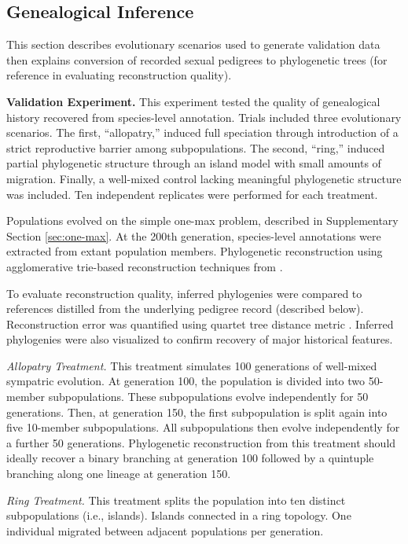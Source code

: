 \subsection{Genealogical Inference}
\label{sec:genealogical-inference}

This section describes evolutionary scenarios used to generate validation data then explains conversion of recorded sexual pedigrees to phylogenetic trees (for reference in evaluating reconstruction quality).

\textbf{Validation Experiment.}
This experiment tested the quality of genealogical history recovered from species-level  annotation.
Trials included three evolutionary scenarios.
The first, ``allopatry,'' induced full speciation through introduction of a strict reproductive barrier among subpopulations.
The second, ``ring,'' induced partial phylogenetic structure through an island model with small amounts of migration.
Finally, a well-mixed control lacking meaningful phylogenetic structure was included.
Ten independent replicates were performed for each treatment.

Populations evolved on the simple one-max problem, described in Supplementary Section \ref{sec:one-max}.
At the 200th generation, species-level annotations were extracted from extant population members.
Phylogenetic reconstruction using agglomerative trie-based reconstruction techniques from \citep{moreno2023toward}.

To evaluate reconstruction quality, inferred phylogenies were compared to references distilled from the underlying pedigree record (described below).
Reconstruction error was quantified using quartet tree distance metric \citep{estabrook1985comparison}.
Inferred phylogenies were also visualized to confirm recovery of major historical features.

\textit{Allopatry Treatment.}
This treatment simulates 100 generations of well-mixed sympatric evolution.
At generation 100, the population is divided into two 50-member subpopulations.
These subpopulations evolve independently for 50 generations.
Then, at generation 150, the first subpopulation is split again into five 10-member subpopulations.
All subpopulations then evolve independently for a further 50 generations.
Phylogenetic reconstruction from this treatment should ideally recover a binary branching at generation 100 followed by a quintuple branching along one lineage at generation 150.

\textit{Ring Treatment.}
This treatment splits the population into ten distinct subpopulations (i.e., islands).
Islands connected in a ring topology.
One individual migrated between adjacent populations per generation.

